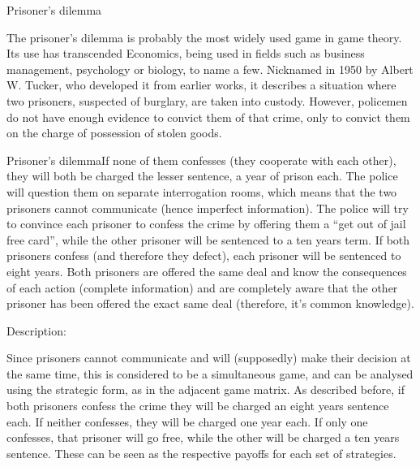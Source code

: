 

Prisoner’s dilemma

The prisoner’s dilemma is probably the most widely used game in game theory. Its use has transcended Economics, being used in fields such as business management, psychology or biology, to name a few. Nicknamed in 1950 by Albert W. Tucker, who developed it from earlier works, it describes a situation where two prisoners, suspected of burglary, are taken into custody. However, policemen do not have enough evidence to convict them of that crime, only to convict them on the charge of possession of stolen goods.

Prisoner's dilemmaIf none of them confesses (they cooperate with each other), they will both be charged the lesser sentence, a year of prison each. The police will question them on separate interrogation rooms, which means that the two prisoners cannot communicate (hence imperfect information). The police will try to convince each prisoner to confess the crime by offering them a “get out of jail free card”, while the other prisoner will be sentenced to a ten years term. If both prisoners confess (and therefore they defect), each prisoner will be sentenced to eight years. Both prisoners are offered the same deal and know the consequences of each action (complete information) and are completely aware that the other prisoner has been offered the exact same deal (therefore, it’s common knowledge).

 

Description:

Since prisoners cannot communicate and will (supposedly) make their decision at the same time, this is considered to be a simultaneous game, and can be analysed using the strategic form, as in the adjacent game matrix. As described before, if both prisoners confess the crime they will be charged an eight years sentence each. If neither confesses, they will be charged one year each. If only one confesses, that prisoner will go free, while the other will be charged a ten years sentence. These can be seen as the respective payoffs for each set of strategies.

